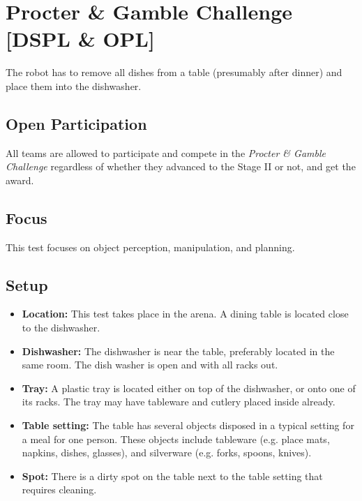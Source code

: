 \section{Procter \& Gamble Challenge [DSPL \& OPL]}

\newcommand{\openpart}{%
All teams are allowed to participate and compete in the \textit{Procter \& Gamble Challenge} regardless of whether they advanced to the Stage II or not, and get the award.
}

The robot has to remove all dishes from a table (presumably after dinner) and place them into the dishwasher.

\subsection{Open Participation}
\openpart

\subsection{Focus}
This test focuses on object perception, manipulation, and planning.

\subsection{Setup}
\begin{itemize}
	\item \textbf{Location:} This test takes place in the arena. A dining table is located close to the dishwasher.
	\item \textbf{Dishwasher:} The dishwasher is near the table, preferably located in the same room. The dish washer is open and with all racks out.
	\item \textbf{Tray:} A plastic tray is located either on top of the dishwasher, or onto one of its racks. The tray may have tableware and cutlery placed inside already.
	\item \textbf{Table setting:} The table has several objects disposed in a typical setting for a meal for one person. These objects include tableware (e.g. place mats, napkins, dishes, glasses), and silverware (e.g. forks, spoons, knives).
	\item \textbf{Spot:} There is a dirty spot on the table next to the table setting that requires cleaning.
\end{itemize}

